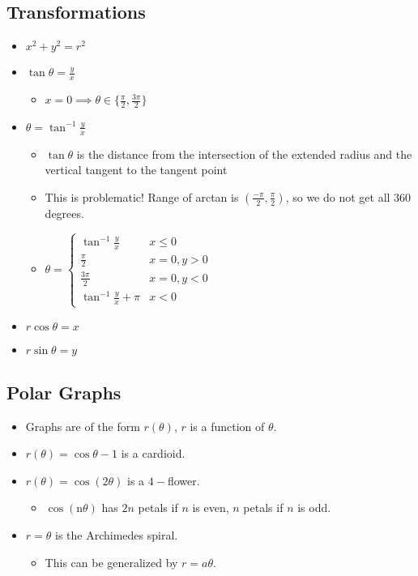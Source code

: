 \documentclass[12pt]{article}
\theoremstyle{plain} %
\theoremstyle{definition}
\theoremstyle{definition}
\theoremstyle{definition}
\theoremstyle{remark}
\begin{document}
\subsection{Transformations}
\begin{itemize}
    \item $x^2+y^2=r^2$
    \item $\tan{\theta} = \frac{y}{x}$
    \begin{itemize}
        \item $x=0 \implies \theta \in \{\frac{\pi}{2}, \frac{3\pi}{2}\}$
    \end{itemize}
    \item $\theta = \tan^{-1}{\frac{y}{x}}$
    \begin{itemize}
        \item $\tan{\theta}$ is the distance from the intersection of the extended radius and the vertical tangent to the tangent point
        \item This is problematic! Range of arctan is $(\frac{-\pi}{2},\frac{\pi}{2})$, so we do not get all $360$ degrees.
        \item $ \theta = \begin{cases}
            \tan^{-1}{\frac{y}{x}} & x\leq 0 \\
            \frac{\pi}{2} & x=0,y>0 \\
            \frac{3\pi}{2} & x=0,y<0 \\
            \tan^{-1}{\frac{y}{x}} + \pi & x < 0
            \end{cases}
        $
    \end{itemize}
    \item $r\cos{\theta} = x$
    \item $r\sin{\theta} = y$
\end{itemize}

\subsection{Polar Graphs}
\begin{itemize}
    \item Graphs are of the form $r(\theta)$, $r$ is a function of $\theta$.
    \item $r(\theta) = \cos{\theta}-1$ is a cardioid.
    \item $r(\theta)=\cos{(2\theta)}$ is a $4-$flower.
    \begin{itemize}
        \item $\cos{(\text{n}\theta)}$ has $2n$ petals if $n$ is even, $n$ petals if $n$ is odd.
    \end{itemize}
    \item $r = \theta$ is the Archimedes spiral.
    \begin{itemize}
        \item This can be generalized by $r = a\theta$.
    \end{itemize}
\end{itemize}
\end{document}
